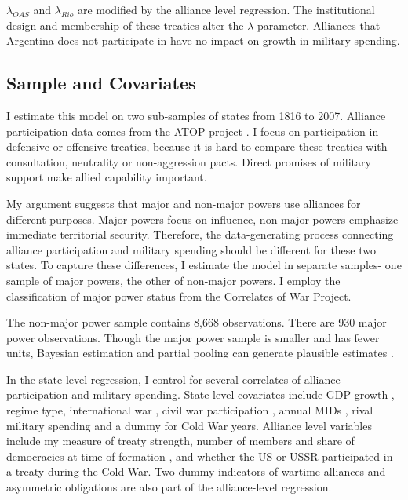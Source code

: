 \documentclass[12pt]{article}
\begin{document}
$\lambda_{OAS}$ and $\lambda_{Rio}$ are modified by the alliance level regression. 
The institutional design and membership of these treaties alter the $\lambda$ parameter.
Alliances that Argentina does not participate in have no impact on growth in military spending.  



\subsection{Sample and Covariates} 

I estimate this model on two sub-samples of states from 1816 to 2007. 
Alliance participation data comes from the ATOP project \citep{Leedsetal2002}. 
I focus on participation in defensive or offensive treaties, because it is hard to compare these treaties with consultation, neutrality or non-aggression pacts. 
Direct promises of military support make allied capability important. 

My argument suggests that major and non-major powers use alliances for different purposes.
Major powers focus on influence, non-major powers emphasize immediate territorial security.  
Therefore, the data-generating process connecting alliance participation and military spending should be different for these two states. 
To capture these differences, I estimate the model in separate samples- one sample of major powers, the other of non-major powers.
I employ the classification of major power status from the Correlates of War Project. 


The non-major power sample contains 8,668 observations. 
There are 930 major power observations. 
Though the major power sample is smaller and has fewer units, Bayesian estimation and partial pooling can generate plausible estimates \citep{Stegmueller2013}. 


In the state-level regression, I control for several correlates of alliance participation and military spending. 
State-level covariates include GDP growth \citep{Boltetal2018}, regime type, international war \citep{Reiteretal2016}, civil war participation \citep{SarkeesWayman2010}, annual MIDs \citep{Gibleretal2016}, rival military spending \citep{ThompsonDreyer2012} and a dummy for Cold War years.
Alliance level variables include my measure of treaty strength, number of members and share of democracies at time of formation \citep{Chibaetal2015}, and whether the US or USSR participated in a treaty during the Cold War. 
Two dummy indicators of wartime alliances and asymmetric obligations \citep{Leedsetal2002} are also part of the alliance-level regression. 
\end{document}
